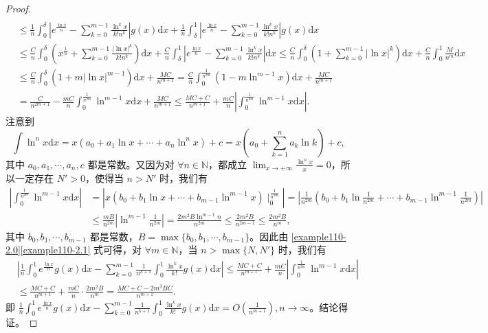 \documentclass[../../main.tex]{subfiles}
\begin{document}
\begin{proof}
\begin{align}
\\
&\leqslant \frac{1}{n}\int_0^{\delta}{\left| e^{\frac{\ln x}{n}}-\sum_{k=0}^{m-1}{\frac{\ln ^kx}{k!n^k}} \right|g\left( x \right) \mathrm{d}x}+\frac{1}{n}\int_{\delta}^1{\left| e^{\frac{\ln x}{n}}-\sum_{k=0}^{m-1}{\frac{\ln ^kx}{k!n^k}} \right|g\left( x \right) \mathrm{d}x}
\nonumber
\\
&\leqslant \frac{C}{n}\int_0^{\delta}{\left( x^{\frac{1}{n}}+\sum_{k=0}^{m-1}{\frac{\left| \ln x \right|^k}{k!n^k}} \right) \mathrm{d}x}+\frac{C}{n}\int_{\delta}^1{\left| e^{\frac{\ln x}{n}}-\sum_{k=0}^{m-1}{\frac{\ln ^kx}{k!n^k}} \right|\mathrm{d}x}\leqslant \frac{C}{n}\int_0^{\delta}{\left( 1+\sum_{k=0}^{m-1}{\left| \ln x \right|^k} \right) \mathrm{d}x}+\frac{C}{n}\int_0^1{\frac{M}{n^m}\mathrm{d}x}
\nonumber
\\
&\leqslant \frac{C}{n}\int_0^{\delta}{\left( 1+m\left| \ln x \right|^{m-1} \right) \mathrm{d}x}+\frac{MC}{n^{m+1}}=\frac{C}{n}\int_0^{\frac{1}{n^{2m}}}{\left( 1-m\ln ^{m-1}x \right) \mathrm{d}x}+\frac{MC}{n^{m+1}}
\nonumber
\\
&=\frac{C}{n^{2m+1}}-\frac{mC}{n}\int_0^{\frac{1}{n^{2m}}}{\ln ^{m-1}x\mathrm{d}x}+\frac{MC}{n^{m+1}}\leqslant \frac{MC+C}{n^{m+1}}+\frac{mC}{n}\left| \int_0^{\frac{1}{n^{2m}}}{\ln ^{m-1}x\mathrm{d}x} \right|.\label{example110-2.0}
\end{align}
注意到
\[
\int\ln^n x\mathrm{d}x=x\left(a_0 + a_1\ln x+\cdots + a_n\ln^n x\right)+c=x\left(a_0+\sum_{k = 1}^{n}a_k\ln k\right)+c,
\]
其中 \(a_0,a_1,\cdots,a_n,c\) 都是常数。又因为对 \(\forall n\in\mathbb{N}\)，都成立 \(\lim_{x\rightarrow +\infty}\frac{\ln^n x}{x}=0\)，所以一定存在 \(N'>0\)，使得当 \(n > N'\) 时，我们有
\begin{align}
\left| \int_0^{\frac{1}{n^{2m}}}{\ln ^{m-1}x\mathrm{d}x} \right|&=\left| x\left( b_0+b_1\ln x+\cdots +b_{m-1}\ln ^{m-1}x \right) \mid_{0}^{\frac{1}{n^{2m}}} \right|=\left| \frac{1}{n^{2m}}\left( b_0+b_1\ln \frac{1}{n^{2m}}+\cdots +b_{m-1}\ln ^{m-1}\frac{1}{n^{2m}} \right) \right|
\nonumber
\\
&\leqslant \frac{mB}{n^{2m}}\left| \ln ^{m-1}\frac{1}{n^{2m}} \right|=\frac{2m^2B\ln ^{m-1}n}{n^{2m}}\leqslant \frac{2m^2B}{n^{2m-1}}\leqslant \frac{2m^2B}{n^m},\label{example110-2.1}
\end{align}
其中 \(b_0,b_1,\cdots,b_{m - 1}\) 都是常数，\(B = \max\{b_0,b_1,\cdots,b_{m - 1}\}\)。因此由 \eqref{example110-2.0}\eqref{example110-2.1} 式可得，对 \(\forall m\in\mathbb{N}\)，当 \(n>\max\{N,N'\}\) 时，我们有
\begin{align*}
&\left|\frac{1}{n}\int_{0}^{1}e^{\frac{\ln x}{n}}g(x)\mathrm{d}x-\sum_{k = 0}^{m - 1}\frac{1}{n^{k + 1}}\int_{0}^{1}\frac{\ln^k x}{k!}g(x)\mathrm{d}x\right|
\leqslant\frac{MC + C}{n^{m + 1}}+\frac{mC}{n}\left|\int_{0}^{\frac{1}{n^{2m}}}\ln^{m - 1}x\mathrm{d}x\right|
\\
&\leqslant\frac{MC + C}{n^{m + 1}}+\frac{mC}{n}\cdot\frac{2m^2B}{n^m}
=\frac{MC + C-2m^3BC}{n^{m + 1}}.
\end{align*}
即 \(\frac{1}{n}\int_{0}^{1}e^{\frac{\ln x}{n}}g(x)\mathrm{d}x-\sum_{k = 0}^{m - 1}\frac{1}{n^{k + 1}}\int_{0}^{1}\frac{\ln^k x}{k!}g(x)\mathrm{d}x=O\left(\frac{1}{n^{m + 1}}\right),n\rightarrow\infty\)。结论得证。

\end{proof}
\end{document}
